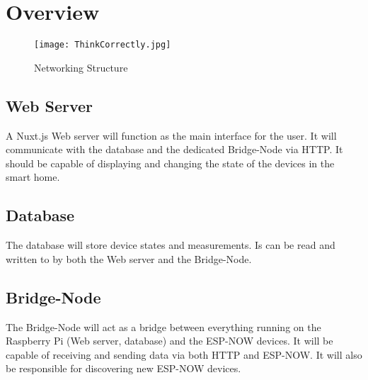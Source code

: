 \section{Overview}

    \begin{figure}[H]
        \centering
        \texttt{[image: ThinkCorrectly.jpg]}
        \caption{Networking Structure}
    \end{figure}
    \subsection{Web Server}
    A Nuxt.js Web server will function as the main interface
    for the user. It will communicate with the database and the
    dedicated Bridge-Node via HTTP. It should be capable of displaying
    and changing the state of the devices in the smart home.
    \subsection{Database}
    The database will store device states and measurements.
    Is can be read and written to by both the Web server and the
    Bridge-Node. 
    \subsection{Bridge-Node}
    The Bridge-Node will act as a bridge between everything running
    on the Raspberry Pi (Web server, database) and the ESP-NOW devices.
    It will be capable of receiving and sending data via both HTTP and
    ESP-NOW. It will also be responsible for discovering new ESP-NOW
    devices.
